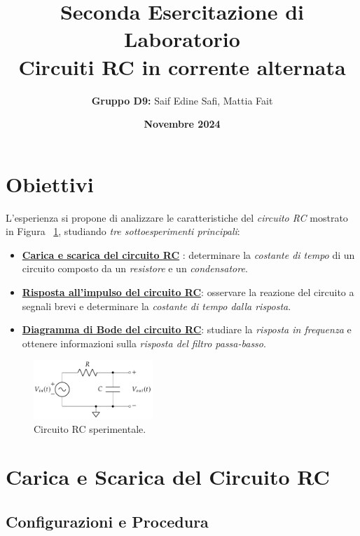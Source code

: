 \documentclass[a4paper,10pt]{article}
\title{\Large\textbf{Seconda Esercitazione di Laboratorio}\\ \vspace{0.5em} \large Circuiti RC in corrente alternata}
\author{\textbf{Gruppo D9:} Saif Edine Safi, Mattia Fait}
\date{\textbf{Novembre 2024}}
\begin{document}
\maketitle

\tableofcontents %
\newpage

    
\section{Obiettivi}

L'esperienza si propone di analizzare le caratteristiche del \textit{circuito RC} mostrato in Figura ~\ref{fig:exp1}, studiando \textit{tre sottoesperimenti principali}:
\begin{itemize}
    \item \textbf{\hyperref[sec:carica_scarica]{Carica e scarica del circuito RC}
    }: determinare la \textit{costante di tempo} di un circuito composto da un \textit{resistore} e un \textit{condensatore}.
    \item \textbf{\hyperref[sec:risposta_impulso]{Risposta all'impulso del circuito RC}}: osservare la reazione del circuito a segnali brevi e determinare la \textit{costante di tempo dalla risposta}.
    \item \textbf{\hyperref[sec:diagramma_bode]{Diagramma di Bode del circuito RC}}: studiare la \textit{risposta in frequenza} e ottenere informazioni sulla \textit{risposta del filtro passa-basso}.
\end{itemize}


\begin{figure}[h!]
    \centering
    \includegraphics[width=0.4\textwidth]{assets/I.png}
    \caption{Circuito RC sperimentale.}
    \label{fig:exp1}
\end{figure}



\section{Carica e Scarica del Circuito RC}  \label{sec:carica_scarica}

\subsection{Configurazioni e Procedura}
\end{document}
